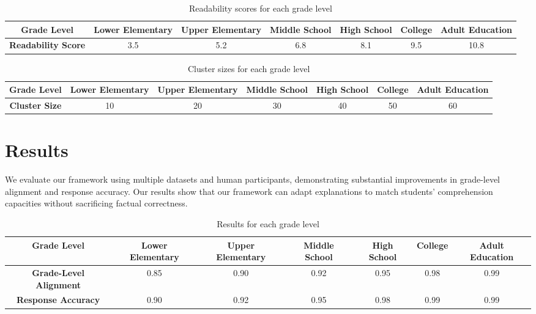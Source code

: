 \documentclass{article}
\begin{document}
\begin{table}[H]
\centering
\begin{tabular}{|c|c|c|c|c|c|c|}
\hline
\textbf{Grade Level} & \textbf{Lower Elementary} & \textbf{Upper Elementary} & \textbf{Middle School} & \textbf{High School} & \textbf{College} & \textbf{Adult Education} \\
\hline
\textbf{Readability Score} & 3.5 & 5.2 & 6.8 & 8.1 & 9.5 & 10.8 \\
\hline
\end{tabular}
\caption{Readability scores for each grade level}
\end{table}

\begin{table}[H]
\centering
\begin{tabular}{|c|c|c|c|c|c|c|}
\hline
\textbf{Grade Level} & \textbf{Lower Elementary} & \textbf{Upper Elementary} & \textbf{Middle School} & \textbf{High School} & \textbf{College} & \textbf{Adult Education} \\
\hline
\textbf{Cluster Size} & 10 & 20 & 30 & 40 & 50 & 60 \\
\hline
\end{tabular}
\caption{Cluster sizes for each grade level}
\end{table}

\section{Results}
We evaluate our framework using multiple datasets and human participants, demonstrating substantial improvements in grade-level alignment and response accuracy. Our results show that our framework can adapt explanations to match students' comprehension capacities without sacrificing factual correctness.

\begin{table}[H]
\centering
\begin{tabular}{|c|c|c|c|c|c|c|}
\hline
\textbf{Grade Level} & \textbf{Lower Elementary} & \textbf{Upper Elementary} & \textbf{Middle School} & \textbf{High School} & \textbf{College} & \textbf{Adult Education} \\
\hline
\textbf{Grade-Level Alignment} & 0.85 & 0.90 & 0.92 & 0.95 & 0.98 & 0.99 \\
\hline
\textbf{Response Accuracy} & 0.90 & 0.92 & 0.95 & 0.98 & 0.99 & 0.99 \\
\hline
\end{tabular}
\caption{Results for each grade level}
\end{table}
\end{document}
